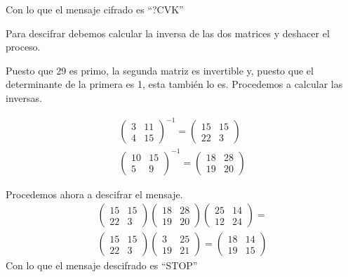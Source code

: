 \begin{problem}[11]
 Con lo que el mensaje cifrado es ``?CVK''

\spart

Para descifrar debemos calcular la inversa de las dos matrices y deshacer el proceso.

Puesto que 29 es primo, la segunda matriz es invertible y, puesto que el determinante de la primera es 1, esta también lo es. Procedemos a calcular las inversas.

\begin{align*}
\left( \begin{array}{cc}
 3 & 11 \\
 4 & 15
  \end{array} \right)^{-1} = \left( \begin{array}{cc}
  15 & 15\\
  22 &  3
  \end{array} \right)\\
\left( \begin{array}{cc}
 10 & 15 \\
 5 & 9
  \end{array} \right)^{-1} = \left( \begin{array}{cc}
  18 & 28\\
  19 &  20
  \end{array} \right)
\end{align*}

Procedemos ahora a descifrar el mensaje.
\begin{align*}
\left( \begin{array}{cc}
  15 & 15\\
  22 &  3
  \end{array} \right)
  \left( \begin{array}{cc}
  18 & 28\\
  19 &  20
  \end{array} \right)
  \left( \begin{array}{cc}
  25 & 14\\
  12 &  24
  \end{array} \right) =\\
\left( \begin{array}{cc}
  15 & 15\\
  22 &  3
  \end{array} \right)
  \left( \begin{array}{cc}
  3 & 25\\
  19 & 21
  \end{array} \right) =
  \left( \begin{array}{cc}
  18 & 14\\
  19 & 15
  \end{array} \right)
\end{align*}
Con lo que el mensaje descifrado es ``STOP''

\end{problem}

